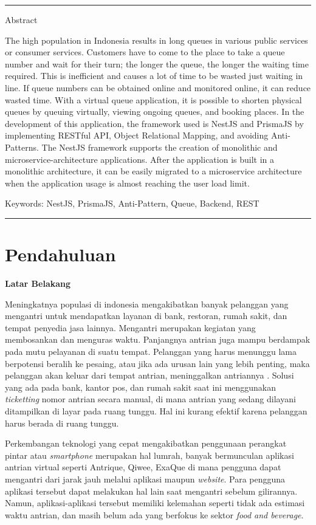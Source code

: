 \noindent\rule{\textwidth}{1pt}
Abstract

The high population in Indonesia results in long queues in various public services or consumer services. Customers have to come to the place to take a queue number and wait for their turn; the longer the queue, the longer the waiting time required. This is inefficient and causes a lot of time to be wasted just waiting in line. If queue numbers can be obtained online and monitored online, it can reduce wasted time. With a virtual queue application, it is possible to shorten physical queues by queuing virtually, viewing ongoing queues, and booking places. In the development of this application, the framework used is NestJS and PrismaJS by implementing RESTful API, Object Relational Mapping, and avoiding Anti-Patterns. The NestJS framework supports the creation of monolithic and microservice-architecture applications. After the application is built in a monolithic architecture, it can be easily migrated to a microservice architecture when the application usage is almost reaching the user load limit.

\bigskip
Keywords: NestJS, PrismaJS, Anti-Pattern, Queue, Backend, REST

\noindent\rule{\textwidth}{1pt}



\section{Pendahuluan}

\noindent\textbf{Latar Belakang}

Meningkatnya populasi di indonesia mengakibatkan banyak pelanggan yang mengantri untuk mendapatkan layanan di bank, restoran, rumah sakit, dan tempat penyedia jasa lainnya. Mengantri merupakan kegiatan yang membosankan dan menguras waktu. Panjangnya antrian juga mampu berdampak pada mutu pelayanan di suatu tempat. Pelanggan yang harus menunggu lama berpotensi beralih ke pesaing, atau jika ada urusan lain yang lebih penting, maka pelanggan akan keluar dari tempat antrian, meninggalkan antriannya \cite{khong2017queue}\cite{Ghazal2016}\cite{Uddin2016}. Solusi yang ada pada bank, kantor pos, dan rumah sakit saat ini menggunakan \textit{ticketting} nomor antrian secara manual, di mana antrian yang sedang dilayani ditampilkan di layar pada ruang tunggu. Hal ini kurang efektif karena pelanggan harus berada di ruang tunggu\cite{Ghazal2016}.

Perkembangan teknologi yang cepat mengakibatkan penggunaan perangkat pintar atau \textit{smartphone} merupakan hal lumrah, banyak bermunculan aplikasi antrian virtual seperti Antrique, Qiwee, ExaQue di mana pengguna dapat mengantri dari jarak jauh melalui aplikasi maupun \textit{website}. Para pengguna aplikasi tersebut dapat melakukan hal lain saat mengantri sebelum gilirannya. Namun, aplikasi-aplikasi tersebut memiliki kelemahan seperti tidak ada estimasi waktu antrian, dan masih belum ada yang berfokus ke sektor \textit{food and beverage}.

